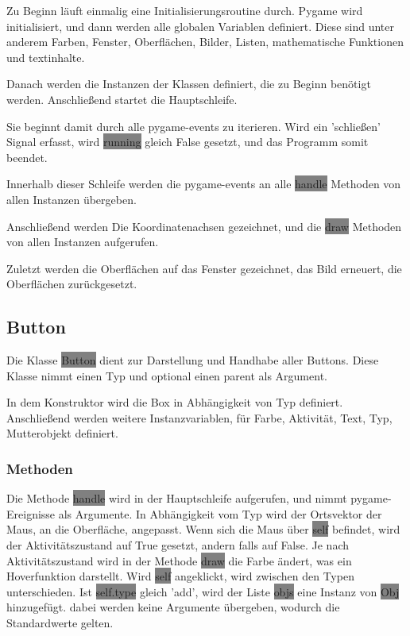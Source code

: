 \documentclass[12pt]{article}
\begin{document}
Zu Beginn läuft einmalig eine Initialisierungsroutine durch.
Pygame wird initialisiert, und dann werden alle globalen Variablen definiert.
Diese sind unter anderem Farben, Fenster, Oberflächen, Bilder, Listen, mathematische Funktionen und textinhalte.

Danach werden die Instanzen der Klassen definiert, die zu Beginn benötigt werden.
Anschließend startet die Hauptschleife.

Sie beginnt damit durch alle pygame-events zu iterieren.
Wird ein 'schließen' Signal erfasst, wird \colorbox{gray}{running} gleich False gesetzt, und das Programm somit beendet.

Innerhalb dieser Schleife werden die pygame-events an alle \colorbox{gray}{handle} Methoden von allen Instanzen übergeben.

Anschließend werden Die Koordinatenachsen gezeichnet, und die \colorbox{gray}{draw} Methoden von allen Instanzen aufgerufen.

Zuletzt werden die Oberflächen auf das Fenster gezeichnet, das Bild erneuert, die Oberflächen zurückgesetzt.
\subsection{Button}
Die Klasse \colorbox{gray}{Button} dient zur Darstellung und Handhabe aller Buttons.
Diese Klasse nimmt einen Typ und optional einen parent als Argument.

In dem Konstruktor wird die Box in Abhängigkeit von Typ definiert.
Anschließend werden weitere Instanzvariablen, für Farbe, Aktivität, Text, Typ, Mutterobjekt definiert.
\subsubsection{Methoden}
Die Methode \colorbox{gray}{handle} wird in der Hauptschleife aufgerufen, und nimmt pygame-Ereignisse als Argumente.
In Abhängigkeit vom Typ wird der Ortsvektor der Maus, an die Oberfläche, angepasst.
Wenn sich die Maus über \colorbox{gray}{self} befindet, wird der Aktivitätszustand auf True gesetzt, andern falls auf False.
Je nach Aktivitätszustand wird in der Methode \colorbox{gray}{draw} die Farbe ändert, was ein Hoverfunktion darstellt.
Wird \colorbox{gray}{self} angeklickt, wird zwischen den Typen unterschieden.
Ist \colorbox{gray}{self.type} gleich 'add', wird der Liste \colorbox{gray}{objs} eine Instanz von \colorbox{gray}{Obj} hinzugefügt.
dabei werden keine Argumente übergeben, wodurch die Standardwerte gelten.
\end{document}
